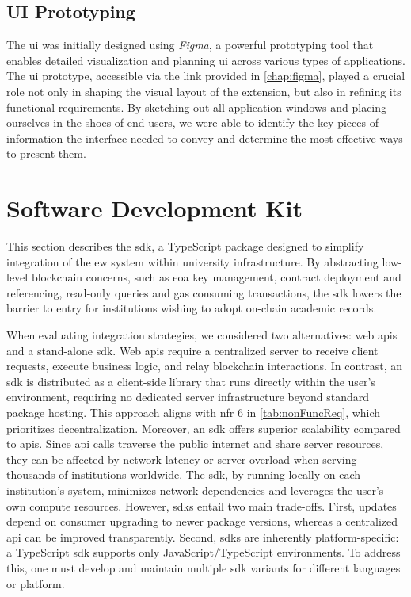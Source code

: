 \subsection{UI Prototyping}
The \gls{ui} was initially designed using \textit{Figma}, a powerful prototyping tool that enables detailed visualization and planning \gls{ui} across various types of applications. The \gls{ui} prototype, accessible via the link provided in \cref{chap:figma}, played a crucial role not only in shaping the visual layout of the extension, but also in refining its functional requirements. 
By sketching out all application windows and placing ourselves in the shoes of end users, we were able to identify the key pieces of information the interface needed to convey and determine the most effective ways to present them. 

\section{Software Development Kit}
\label{sec:sdkDesign}
This section describes the \gls{sdk}, a TypeScript package designed to simplify integration of the \gls{ew} system within university infrastructure. By abstracting low-level blockchain concerns, such as \gls{eoa} key management, contract deployment and referencing, read-only queries and gas consuming transactions, the \gls{sdk} lowers the barrier to entry for institutions wishing to adopt on-chain academic records.

When evaluating integration strategies, we considered two alternatives: web \glspl{api} and a stand-alone \gls{sdk}. Web \glspl{api} require a centralized server to receive client requests, execute business logic, and relay blockchain interactions. In contrast, an \gls{sdk} is distributed as a client-side library that runs directly within the user's environment, requiring no dedicated server infrastructure beyond standard package hosting. This approach aligns with \gls{nfr} 6 in \cref{tab:nonFuncReq}, which prioritizes decentralization.
Moreover, an \gls{sdk} offers superior scalability compared to \glspl{api}. Since \gls{api} calls traverse the public internet and share server resources, they can be affected by network latency or server overload when serving thousands of institutions worldwide. The \gls{sdk}, by running locally on each institution's system, minimizes network dependencies and leverages the user's own compute resources.
However, \glspl{sdk} entail two main trade-offs. First, updates depend on consumer upgrading to newer package versions, whereas a centralized \gls{api} can be improved transparently. Second, \glspl{sdk} are inherently platform-specific: a TypeScript \gls{sdk} supports only JavaScript/TypeScript environments. To address this, one must develop and maintain multiple \gls{sdk} variants for different languages or platform.

